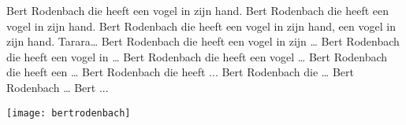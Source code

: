 \beginverse*
Bert Rodenbach die heeft een vogel in zijn hand. 
Bert Rodenbach die heeft een vogel in zijn hand.
Bert Rodenbach die heeft een vogel in zijn hand, een vogel in zijn hand. Tarara…
\endverse
\beginverse
Bert Rodenbach die heeft een vogel in zijn …
\endverse
\beginverse
Bert Rodenbach die heeft een vogel in …
\endverse
\beginverse
Bert Rodenbach die heeft een vogel …
\endverse
\beginverse
Bert Rodenbach die heeft een …
\endverse
\beginverse
Bert Rodenbach die heeft ...
\endverse
\beginverse
Bert Rodenbach die …
\endverse
\beginverse
Bert Rodenbach …
\endverse
\beginverse
Bert ...
\endverse
\endsong
\begin{intersong}
    \texttt{[image: bertrodenbach]}
\end{intersong}